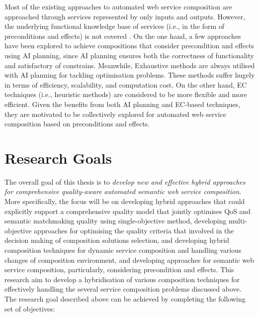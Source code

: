 Most of the existing approaches to automated web service composition are approached through services represented by only inputs and outputs. However, the underlying functional knowledge base of services (i.e., in the form of preconditions and effects) is not covered \cite{paliwal2012semantics}. On the one hand, a few approaches \cite{bansal2016generalized,DBLP:journals/soca/BoustilMS14} have been explored to achieve compositions that consider precondition and effects using AI planning, since AI planning ensures both the correctness of functionality and satisfactory of constrains. Meanwhile, Exhaustive methods are always utilised with AI planning for tackling optimisation problems. These methods suffer hugely in terms of efficiency, scalability, and computation cost. On the other hand, EC techniques (i.e., heuristic methods) are considered to be more flexible and more efficient. Given the benefits from both AI planning and EC-based techniques, they are motivated to be collectively explored for automated web service composition based on preconditions and effects.
 
\section{Research Goals}
The overall goal of this thesis is to \emph{develop new and effective hybrid approaches for comprehensive quality-aware automated semantic web service composition}. More specifically, the focus will be on developing hybrid approaches that could explicitly support a comprehensive quality model that jointly optimises QoS and semantic matchmaking quality using single-objective method, developing multi-objective approaches for optimising the quality criteria that involved in the decision making of composition solutions selection, and developing hybrid composition techniques for dynamic service composition and handling various changes of composition environment, and developing approaches for semantic web service composition, particularly, considering precondition and effects. This research aim to develop a hybridisation of various composition techniques for effectively handling the several service composition problems discussed above. The research goal described above can be achieved by completing the following set of objectives:


